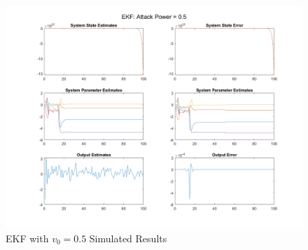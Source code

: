 \documentclass[]{ieeetran}
\begin{document}
\begin{figure}
	\centering
	\includegraphics[width=\linewidth]{../../fig/EKF_attack_0_5}
	\caption{EKF with $v_0 = 0.5$ Simulated Results}
	\label{fig:ekfattack05}
\end{figure}
\end{document}
